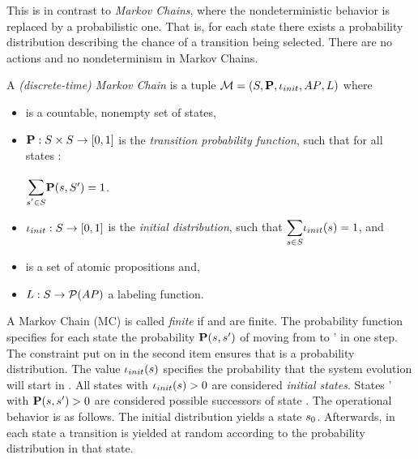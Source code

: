 \documentclass[preview]{standalone}
\begin{document}
This is in contrast to \emph{Markov Chains}, where the nondeterministic behavior is replaced by a probabilistic one. That is, for each state there exists a probability distribution describing the chance of a transition being selected. There are no actions and no nondeterminism in Markov Chains.
%
\begin{definition}
	A \emph{(discrete-time) Markov Chain} is a tuple ${\mathcal{M}} = ({S}, {\textbf{P}}, {\iota_{init}}, {AP}, {L})$ where 
	\begin{itemize}
		\item \states is a countable, nonempty set of states,
		\item ${\textbf{P}} : {S} \times {S} \to [0,1]$ is the \emph{transition probability function}, such that for all states \state:
		\begin{center}
			$\bbigsum{\state' \in \states}\probtfunc(\state,\states') = 1$.	
		\end{center}
		\item ${\iota_{init}} : {S} \to [0,1]$ is the \emph{initial distribution}, such that $\mathlarger{\sum_{\state \in \states}} \initdistrib(\state) = 1$, and
		\item \atomicprops is a set of atomic propositions and,
		\item ${L} : {S} \to {\mathcal{P}(\ensuremath{{AP}})}$ a labeling function.		
	\end{itemize}
\end{definition}

A Markov Chain (MC) \autm is called \emph{finite} if \states and \atomicprops are finite. The probability function \probtfunc specifies for each state \state the probability ${\textbf{P}}({s},{s}')$ of moving from \state to \state' in one step. The constraint put on \probtfunc in the second item ensures that \probtfunc is a probability distribution. The value ${\iota_{init}}({s})$ specifies the probability that the system evolution will start in \state. All states \state with ${\iota_{init}}({s}) > 0$ are considered \emph{initial states}. States \state' with ${\textbf{P}}({s}, {s}') > 0$ are considered possible successors of state \state. The operational behavior is as follows. The initial distribution \initdistrib yields a state ${s}_0$. Afterwards, in each state a transition is yielded at random according to the probability distribution \probtfunc in that state.
\end{document}

